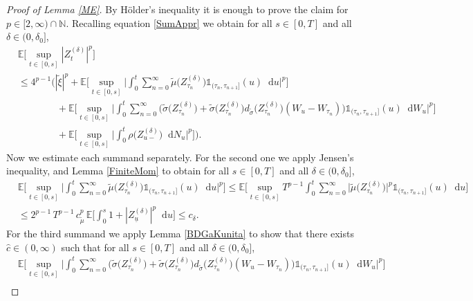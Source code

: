 \documentclass[11pt,a4paper]{article}
\numberwithin{equation}{section}
\theoremstyle{definition}
\newcommand{\E}{{\mathbb{E}}}
\newcommand{\N}{{\mathbb{N}}}
\newcommand{\diff}{\mathop{}\!\mathrm{d}}
\begin{document}
\begin{proof}[Proof of Lemma \ref{ME}]
By Hölder's inequality it is enough to prove the claim for $p\in[2,\infty)\cap\N$.
Recalling equation \eqref{SumAppr} we obtain for all $s\in[0,T]$ and all $\delta\in(0,\delta_0]$,
\begin{equation}
    \begin{aligned}\label{ME1}
    &\E\Big[\sup_{t\in[0,s]} |Z^{(\delta)}_{t}|^p\Big]  \\
    & \leq 4^{p-1} \Big(  |\widetilde\xi|^p
    + \E\Big[\sup_{t\in[0,s]}\Big|\int_0^t \sum_{n=0}^{\infty}  \widetilde \mu\big(Z^{(\delta)}_{\tau_{n}}\big)\mathds{1}_{(\tau_n,\tau_{n+1}]}(u) \diff u\Big|^p\Big] \\
    &\quad\quad\quad\quad+ \E\Big[\sup_{t\in[0,s]}\Big|\int_0^t \sum_{n=0}^{\infty} \Big(\widetilde \sigma\big(Z^{(\delta)}_{\tau_{n}}\big) + \widetilde\sigma \big(Z^{(\delta)}_{\tau_n}\big) d_{\widetilde\sigma} \big(Z^{(\delta)}_{\tau_n}\big) (W_{u}-W_{\tau_n}) \Big)\mathds{1}_{(\tau_n,\tau_{n+1}]}(u) \diff W_u\Big|^p\Big] \\
    &\quad\quad\quad\quad+ \E\Big[\sup_{t\in[0,s]}\Big|\int_0^t\rho\big(Z^{(\delta)}_{u-}\big) \diff N_u\Big|^p\Big] \Big).
\end{aligned}
\end{equation}
Now we estimate each summand separately. For the second one we apply Jensen's inequality, and Lemma \ref{FiniteMom} to obtain for all $s\in[0,T]$ and all $\delta\in(0,\delta_0]$,
\begin{equation}
    \begin{aligned}\label{ME2}
    &\E\Big[\sup_{t\in[0,s]}\Big|\int_0^t \sum_{n=0}^{\infty} \widetilde \mu\big(Z^{(\delta)}_{\tau_{n}}\big)\mathds{1}_{(\tau_n,\tau_{n+1}]}(u) \diff u\Big|^p\Big] 
    \leq \E\Big[\sup_{t\in[0,s]} T^{p-1} \int_0^t  \sum_{n=0}^{\infty} \big|\widetilde \mu\big(Z^{(\delta)}_{\tau_{n}}\big)\big|^p  \mathds{1}_{(\tau_n,\tau_{n+1}]}(u) \diff u\Big] \\
    &\leq 2^{p-1}\, T^{p-1}\, c_{\widetilde\mu}^p\, \E\Big[\int_0^s  1 + |Z^{(\delta)}_{\underline u}|^p \diff u\Big] \leq c_\delta.
\end{aligned}
\end{equation}
For the third summand we apply Lemma \ref{BDGaKunita} to show that there exists $\hat c\in(0,\infty)$ such that for all $s\in[0,T]$ and all $\delta\in(0,\delta_0]$,
\begin{equation}
    \begin{aligned}\label{ME13}
    &\E\Big[\sup_{t\in[0,s]}\Big|\int_0^t \sum_{n=0}^{\infty} \Big(\widetilde \sigma\big(Z^{(\delta)}_{\tau_{n}}\big) + \widetilde\sigma \big(Z^{(\delta)}_{\tau_n}\big) d_{\widetilde\sigma} \big(Z^{(\delta)}_{\tau_n}\big) (W_{u}-W_{\tau_n}) \Big)\mathds{1}_{(\tau_n,\tau_{n+1}]}(u) \diff W_u\Big|^p\Big]\\

\end{aligned}
\end{equation}
\end{proof}
\end{document}
